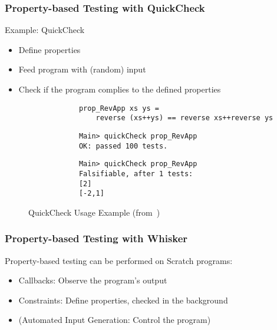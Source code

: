 \begin{frame}
\end{frame}

\begin{frame}[fragile]\frametitle{Property-based Testing with QuickCheck}
    Example: QuickCheck

    \medskip

    \begin{itemize}
        \item Define properties
        \item Feed program with (random) input
        \item Check if the program complies to the defined properties
    \end{itemize}

    \pause
    \medskip

    \begin{figure}
        \begin{verbatim}
            prop_RevApp xs ys =
                reverse (xs++ys) == reverse xs++reverse ys
        \end{verbatim}

        \begin{verbatim}
            Main> quickCheck prop_RevApp
            OK: passed 100 tests.
        \end{verbatim}

        \begin{verbatim}
            Main> quickCheck prop_RevApp
            Falsifiable, after 1 tests:
            [2]
            [-2,1]
        \end{verbatim}

        \caption{QuickCheck Usage Example (from~\cite{quickcheck})}
    \end{figure}
\end{frame}

\begin{frame}\frametitle{Property-based Testing with Whisker}
    Property-based testing can be performed on Scratch programs:
    \begin{itemize}
        \item \textcolor{upfim}{Callbacks:} Observe the program's output
        \item \textcolor{upfim}{Constraints}: Define properties, checked in the background
        \item (\textcolor{upfim}{Automated Input Generation}: Control the program)
    \end{itemize}
\end{frame}

